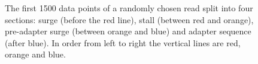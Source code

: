 \begin{figure}
\centering

\caption{\label{fig:start-sections}The first 1500 data points of a randomly chosen read split into four sections: surge (before the red line), stall (between red and orange), pre-adapter surge (between orange and blue) and adapter sequence (after blue). In order from left to right the vertical lines are red, orange and blue.}
\end{figure}
